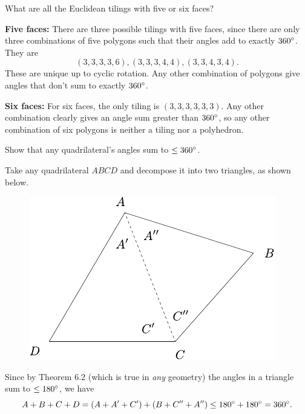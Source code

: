 \documentclass[twoside,10pt]{article}
\begin{document}
\newpage

\begin{exer}[5.26]
What are all the Euclidean tilings with five or six faces?
\end{exer}

\textbf{Five faces:} There are three possible tilings with five faces, since there are only three combinations of five polygons such that their angles add to exactly $360^\circ$. They are
\[
	(3,3,3,3,6), (3,3,3,4,4), (3,3,4,3,4).
\] These are unique up to cyclic rotation. Any other combination of polygons give angles that don't sum to exactly $360^\circ$.

\textbf{Six faces:} For six faces, the only tiling is $(3,3,3,3,3,3)$. Any other combination clearly gives an angle sum greater than $360^\circ$, so any other combination of six polygons is neither a tiling nor a polyhedron.

\newpage

\begin{exer}[6.5]
Show that any quadrilateral's angles sum to $\leq 360^\circ$.
\end{exer}

Take any quadrilateral $ABCD$ and decompose it into two triangles, as shown below.

\begin{figure}[H]
	\centering
	\includegraphics[scale=1]{fig/5.pdf}
\end{figure}

Since by Theorem 6.2 (which is true in \textit{any} geometry) the angles in a triangle sum to $\leq 180^\circ$, we have
\[
	A + B+C+D = (A+A'+C')+(B+C''+A'') \leq 180^\circ + 180^\circ = 360^\circ.
\] 
\end{document}
